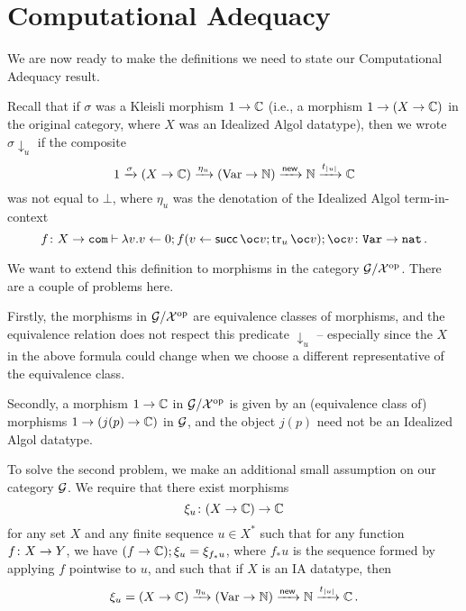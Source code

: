 \documentclass{report}[11pt]
\begin{document}
\section{Computational Adequacy}

We are now ready to make the definitions we need to state our Computational Adequacy result.

Recall that if $\sigma$ was a Kleisli morphism $1 \to \mathbb{C}$ (i.e., a morphism $1 \to (X \to \mathbb{C})$ in the original category, where $X$ was an Idealized Algol datatype), then we wrote $\sigma\downarrow_u$ if the composite
\[
  1 \xrightarrow{\sigma} (X \to \mathbb{C}) \xrightarrow{\eta_u} (\operatorname{Var} \to \mathbb{N}) \xrightarrow{\operatorname{{\mathsf{new}}}} \mathbb{N} \xrightarrow{t_{|u|}} \mathbb{C}
  \]
was not equal to $\bot$, where $\eta_u$ was the denotation of the Idealized Algol term-in-context
\[
  f \from X \to \com \ts \lambda v.v\gets 0;f(v\gets\suc\oc v;\tr_u \oc v);\oc v \from \Var \to \nat\,.
  \]

We want to extend this definition to morphisms in the category $\mathcal G/\mathcal X^{\mathrm{op}}$.  
There are a couple of problems here.  

Firstly, the morphisms in $\mathcal G/\mathcal X^{\mathrm{op}}$ are equivalence classes of \Mellies morphisms, and the equivalence relation does not respect this predicate $\downarrow_u$ -- especially since the $X$ in the above formula could change when we choose a different representative of the equivalence class.

Secondly, a morphism $1 \to \mathbb{C}$ in $\mathcal G/\mathcal X^{\mathrm{op}}$ is given by an (equivalence class of) morphisms $1 \to (j(p) \to \mathbb{C})$ in $\mathcal G$, and the object $j(p)$ need not be an Idealized Algol datatype.

To solve the second problem, we make an additional small assumption on our category $\mathcal G$.  
We require that there exist morphisms
\[
  \xi_u \colon (X \to \mathbb{C}) \to \mathbb{C}
  \]
for any set $X$ and any finite sequence $u\in X^*$ such that for any function $f \colon X \to Y$, we have $(f\to \mathbb{C});\xi_u = \xi_{f_*u}$, where $f_*u$ is the sequence formed by applying $f$ pointwise to $u$, and such that if $X$ is an IA datatype, then
\[
  \xi_u = (X \to \mathbb{C}) \xrightarrow{\eta_u} (\operatorname{Var} \to \mathbb{N}) \xrightarrow{\operatorname{{\mathsf{new}}}} \mathbb{N} \xrightarrow{t_{|u|}} \mathbb{C}\,.
  \]
\end{document}
